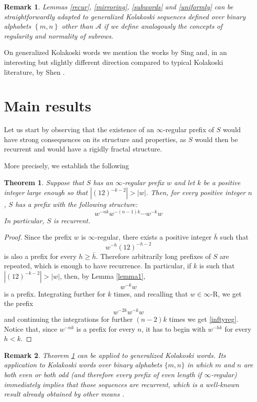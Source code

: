 \documentclass[10pt,a4paper]{article}
\newtheorem{theorem}{Theorem}
\newtheorem{rem}{Remark}
\begin{document}
\begin{rem}
Lemmas \ref{recur}, \ref{mirroring}, \ref{subwords} and \ref{uniformly} can be straightforwardly adapted to generalized Kolakoski sequences defined over binary alphabets $\left\lbrace m,n\right\rbrace$ other than $\mathcal{A}$ if we define analogously the concepts of regularity and normality of subrows.  
\end{rem}
On generalized Kolakoski words we mention the works by Sing \cite{sing2004kolakoski,sing2010more} and, in an interesting but slightly different direction compared to typical Kolakoski literature, by Shen \cite{shen2018kolakoski}. 
\section{Main results}
\label{mr}
 Let us start by observing that the existence of an $\infty$-regular prefix of $S$ would have strong consequences on its structure and properties, as $S$ would then be recurrent and would have a rigidly fractal structure. 

 More precisely, we establish the following
\begin{theorem}
Suppose that $S$ has an $\infty$-regular prefix $w$ and let $k$ be a positive integer large enough so that $|(12)^{-k-2}|>|w|$. Then, for every positive integer $n$, $S$ has a prefix with the following structure:
\begin{equation}
w^{-nk}w^{-(n-1)k}\cdots w^{-k}w
\label{inftyreg}
\end{equation} 
In particular, $S$ is recurrent.  
\label{infty}
\end{theorem}
\begin{proof}
Since the prefix $w$ is $\infty$-regular, there exists a positive integer $\bar{h}$ such that $$w^{-h}(12)^{-h-2}$$ is also a prefix for every $h \ge \bar{h}$. Therefore arbitrarily long prefixes of $S$ are repeated, which is enough to have recurrence. In particular, if $k$ is such that $|(12)^{-k-2}|>|w|$, then, by Lemma \ref{lemma1}, $$w^{-k}w$$ is a prefix. Integrating further for $k$ times, and recalling that $w\in \infty$-R, we get the prefix $$w^{-2k}w^{-k}w$$ and continuing the integrations for further $(n-2)k$ times we get \eqref{inftyreg}. Notice that, since $w^{-nk}$ is a prefix for every $n$,  it has to begin with $w^{-hk}$ for every $h<k$.  
\end{proof}
\begin{rem}
Theorem \ref{infty} can be applied to generalized Kolakoski words. Its application to Kolakoski words over binary alphabets $\lbrace m,n \rbrace$ in which $m$ and $n$ are both even or both odd (and therefore every prefix of even length if $\infty$-regular) immediately implies that those sequences are recurrent, which is a well-known result already obtained by other means \cite{sing2010more}.
\end{rem}
\end{document}
